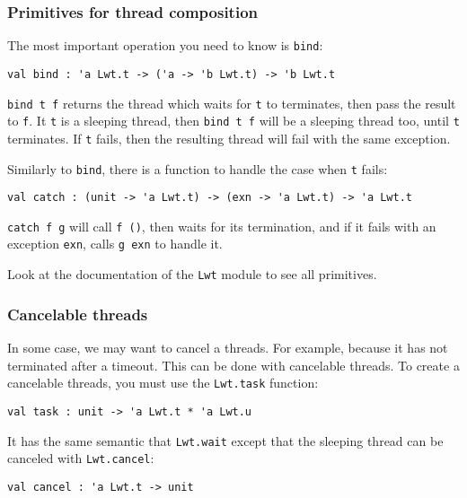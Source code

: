 \documentclass{article}
\begin{document}
\subsubsection{Primitives for thread composition}

The most important operation you need to know is \texttt{bind}:

\begin{verbatim}
val bind : 'a Lwt.t -> ('a -> 'b Lwt.t) -> 'b Lwt.t
\end{verbatim}

\texttt{bind t f} returns the thread which waits for \texttt{t} to
terminates, then pass the result to \texttt{f}. It \texttt{t} is a
sleeping thread, then \texttt{bind t f} will be a sleeping thread too,
until \texttt{t} terminates. If \texttt{t} fails, then the resulting
thread will fail with the same exception.

Similarly to \texttt{bind}, there is a function to handle the case
when \texttt{t} fails:

\begin{verbatim}
val catch : (unit -> 'a Lwt.t) -> (exn -> 'a Lwt.t) -> 'a Lwt.t
\end{verbatim}

\texttt{catch f g} will call \texttt{f ()}, then waits for its
termination, and if it fails with an exception \texttt{exn}, calls
\texttt{g exn} to handle it.

Look at the documentation of the \texttt{Lwt} module to see all
primitives.

\subsubsection{Cancelable threads}

In some case, we may want to cancel a threads. For example, because it
has not terminated after a timeout. This can be done with cancelable
threads. To create a cancelable threads, you must use the
\texttt{Lwt.task} function:

\begin{verbatim}
val task : unit -> 'a Lwt.t * 'a Lwt.u
\end{verbatim}

It has the same semantic that \texttt{Lwt.wait} except that the
sleeping thread can be canceled with \texttt{Lwt.cancel}:

\begin{verbatim}
val cancel : 'a Lwt.t -> unit
\end{verbatim}
\end{document}
